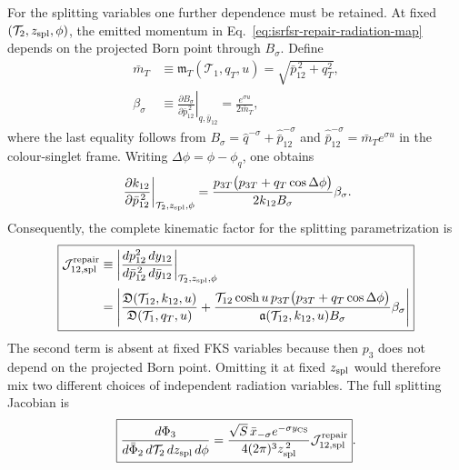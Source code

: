 \documentclass[11pt]{article}
\newcommand{\Ph}{\Phi}
\begin{document}
For the splitting variables one further dependence must be retained.  At fixed
$(\mathcal T_2,z_{\rm spl},\phi)$, the emitted momentum in
Eq.~\eqref{eq:isrfsr-repair-radiation-map} depends on the projected Born point through
$B_\sigma$.  Define
\begin{align}
\bar m_T
&\equiv
\mathfrak m_T(\mathcal T_1,q_T,u)
=\sqrt{\bar p_{12}^{\,2}+q_T^2},
\nonumber\\
\beta_\sigma
&\equiv
\left.
\frac{\partial B_\sigma}{\partial\bar p_{12}^{\,2}}
\right|_{q,\bar y_{12}}
=
\frac{e^{\sigma u}}{2\bar m_T},
\label{eq:isrfsr-repair-B-derivative}
\end{align}
where the last equality follows from
$B_\sigma=\hat q^{-\sigma}+\hat{\bar p}_{12}^{-\sigma}$ and
$\hat{\bar p}_{12}^{-\sigma}=\bar m_T e^{\sigma u}$ in the colour-singlet frame.  Writing
$\Delta\phi=\phi-\phi_q$, one obtains
\begin{equation}
\left.
\frac{\partial k_{12}}{\partial\bar p_{12}^{\,2}}
\right|_{\mathcal T_2,z_{\rm spl},\phi}
=
\frac{
p_{3T}\bigl(p_{3T}+q_T\cos\Delta\phi\bigr)
}{
2k_{12}B_\sigma
}
\beta_\sigma .
\label{eq:isrfsr-repair-k-derivative}
\end{equation}
Consequently, the complete kinematic factor for the splitting parametrization is
\begin{equation}
\boxed{\begin{aligned}
\mathcal J_{12,\rm spl}^{\rm repair}
&\equiv
\left|
\frac{d p_{12}^2\,dy_{12}}
{d\bar p_{12}^{\,2}\,d\bar y_{12}}
\right|_{\mathcal T_2,z_{\rm spl},\phi}
\\
&=
\left|
\frac{
\mathfrak D(\mathcal T_{12},k_{12},u)
}{
\mathfrak D(\mathcal T_1,q_T,u)
}
+
\frac{
\mathcal T_{12}\cosh u\,
p_{3T}\bigl(p_{3T}+q_T\cos\Delta\phi\bigr)
}{
\mathfrak a(\mathcal T_{12},k_{12},u)B_\sigma
}
\beta_\sigma
\right|
\end{aligned}}
\label{eq:isrfsr-repair-splitting-kinematic-jacobian}
\end{equation}
The second term is absent at fixed FKS variables because then $p_3$ does not depend on the projected Born
point.  Omitting it at fixed $z_{\rm spl}$ would therefore mix two different choices of independent
radiation variables.  The full splitting Jacobian is
\begin{equation}
\boxed{
\frac{d\Ph_3}
{d\bar\Ph_2\,d\mathcal T_2\,dz_{\rm spl}\,d\phi}
=
\frac{
\sqrt S\,\bar x_{-\sigma}e^{-\sigma y_{\rm CS}}
}{
4(2\pi)^3z_{\rm spl}^{\,2}
}
\mathcal J_{12,\rm spl}^{\rm repair}
}.
\label{eq:isrfsr-repair-splitting-jacobian}
\end{equation}
\end{document}
